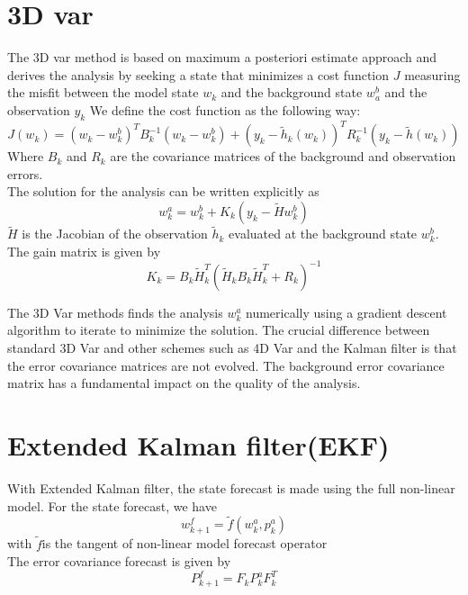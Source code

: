 \documentclass[a4,12pt]{article}
\numberwithin{equation}{section}
\begin{document}
\section{3D var}
The 3D var method is based on maximum a posteriori estimate approach and derives the analysis by seeking a state that minimizes a cost function $J$ measuring the misfit between the model state $w_k$ and the background state $w_a^b$ and the observation $y_k$
We define  the cost function as the following way:
\begin{equation}
    J(w_k) = (w_k - w_k^b)^T B_k^{-1} (w_k - w_k^b) + (y_k - \tilde h_k (w_k)) ^T R_k^{-1} (y_k - \tilde h (w_k)) 
\label{costFunc}
\end{equation}
Where $B_k$ and $R_k$ are the covariance matrices of the background and observation errors. \\
The solution for the analysis can be written explicitly as 
\begin{equation}
    w_k^a = w_k^b + K_k (y_k - \tilde H w_k^b)
\label{sol3D}
\end{equation}
$\tilde H$ is the Jacobian of the observation $\tilde h_k$ evaluated at the background state $w_k^b$. \\
The gain matrix is given by
\begin{equation}
    K_k =  B_k \tilde H_k^T(  \tilde H_k B_k \tilde H_k^T + R_k)^{-1}
\label{matrixGain3D}
\end{equation}


The 3D Var methods finds the analysis $w_k^a$ numerically using a gradient descent algorithm to iterate to minimize the solution.
The crucial difference between standard 3D Var and other schemes such as 4D Var and the Kalman filter is that the error covariance matrices are not evolved. The background error covariance matrix has a fundamental impact on the quality of the analysis.
\section{Extended Kalman filter(EKF)}  
With Extended Kalman filter, the state forecast is made using the full non-linear model.
For the state forecast, we have 
\begin{equation}
w_{k+1}^f = \tilde{f} (w_k^a, p_k^a)
\label{EKFfor}
\end{equation}
with $\tilde{f} $is the tangent of non-linear model forecast operator 
~~\\
The error covariance forecast is given by 
\begin{equation}
P_{k+1}^f = F_k P_k^a F_k^T
\label{CovEKF}
\end{equation}
\end{document}
